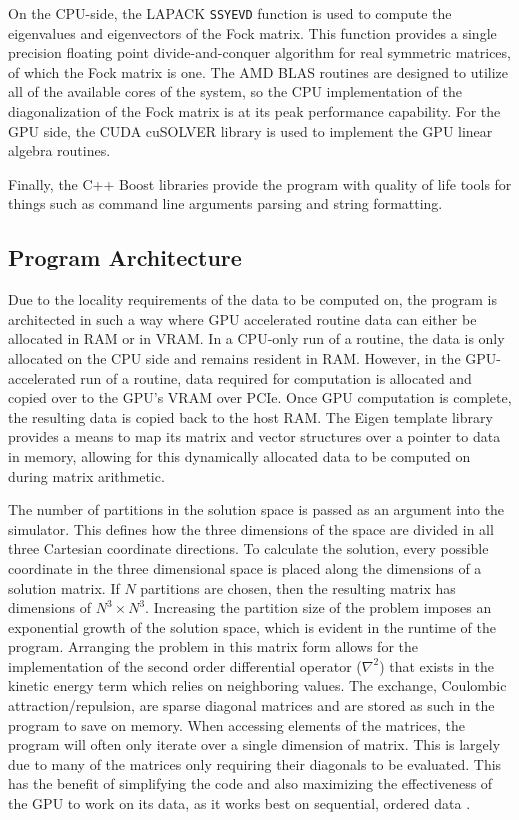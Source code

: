 \documentclass[conference, twoside]{IEEEtran}
\begin{document}
On the CPU-side, the LAPACK \texttt{SSYEVD} function is used to compute the eigenvalues and eigenvectors of the Fock matrix. This function provides a single precision floating point divide-and-conquer algorithm for real symmetric matrices, of which the Fock matrix is one. The AMD BLAS routines are designed to utilize all of the available cores of the system, so the CPU implementation of the diagonalization of the Fock matrix is at its peak performance capability. For the GPU side, the CUDA cuSOLVER library is used to implement the GPU linear algebra routines.

Finally, the C++ Boost libraries provide the program with quality of life tools for things such as command line arguments parsing and string formatting.

\subsection{Program Architecture} %

Due to the locality requirements of the data to be computed on, the program is architected in such a way where GPU accelerated routine data can either be allocated in RAM or in VRAM. In a CPU-only run of a routine, the data is only allocated on the CPU side and remains resident in RAM. However, in the GPU-accelerated run of a routine, data required for computation is allocated and copied over to the GPU's VRAM over PCIe. Once GPU computation is complete, the resulting data is copied back to the host RAM. The Eigen template library provides a means to map its matrix and vector structures over a pointer to data in memory, allowing for this dynamically allocated data to be computed on during matrix arithmetic.

The number of partitions in the solution space is passed as an argument into the simulator. This defines how the three dimensions of the space are divided in all three Cartesian coordinate directions. To calculate the solution, every possible coordinate in the three dimensional space is placed along the dimensions of a solution matrix. If $N$ partitions are chosen, then the resulting matrix has dimensions of $N^3 \times N^3$. Increasing the partition size of the problem imposes an exponential growth of the solution space, which is evident in the runtime of the program. Arranging the problem in this matrix form allows for the implementation of the second order differential operator ($\nabla^2$) that exists in the kinetic energy term which relies on neighboring values. The exchange, Coulombic attraction/repulsion, are sparse diagonal matrices and are stored as such in the program to save on memory. When accessing elements of the matrices, the program will often only iterate over a single dimension of matrix. This is largely due to many of the matrices only requiring their diagonals to be evaluated. This has the benefit of simplifying the code and also maximizing the effectiveness of the GPU to work on its data, as it works best on sequential, ordered data \cite{special-purpose-hf-computer}.
\end{document}

